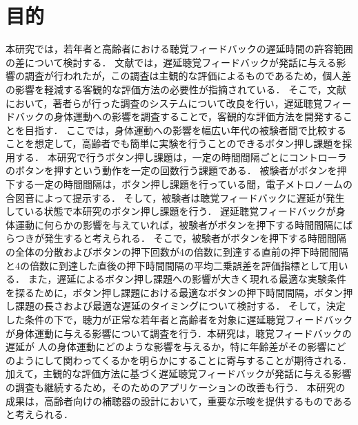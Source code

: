 \section{目的}
本研究では，若年者と高齢者における聴覚フィードバックの遅延時間の許容範囲の差について検討する．
文献\cite{kayama}では，遅延聴覚フィードバックが発話に与える影響の調査が行われたが，この調査は主観的な評価によるものであるため，個人差の影響を軽減する客観的な評価方法の必要性が指摘されている．
そこで，文献\cite{shigematu}において，著者らが行った調査のシステムについて改良を行い，遅延聴覚フィードバックの身体運動への影響を調査することで，客観的な評価方法を開発することを目指す．
ここでは，身体運動への影響を幅広い年代の被験者間で比較することを想定して，高齢者でも簡単に実験を行うことのできるボタン押し課題を採用する．
本研究で行うボタン押し課題は，一定の時間間隔ごとにコントローラのボタンを押すという動作を一定の回数行う課題である．
被験者がボタンを押下する一定の時間間隔は，ボタン押し課題を行っている間，電子メトロノームの合図音によって提示する．
そして，被験者は聴覚フィードバックに遅延が発生している状態で本研究のボタン押し課題を行う．
遅延聴覚フィードバックが身体運動に何らかの影響を与えていれば，被験者がボタンを押下する時間間隔にばらつきが発生すると考えられる．
そこで，被験者がボタンを押下する時間間隔の全体の分散およびボタンの押下回数が4の倍数に到達する直前の押下時間間隔と4の倍数に到達した直後の押下時間間隔の平均二乗誤差を評価指標として用いる．
また，遅延によるボタン押し課題への影響が大きく現れる最適な実験条件を探るために，ボタン押し課題における最適なボタンの押下時間間隔，ボタン押し課題の長さおよび最適な遅延のタイミングについて検討する．
そして，決定した条件の下で，聴力が正常な若年者と高齢者を対象に遅延聴覚フィードバックが身体運動に与える影響について調査を行う．本研究は，聴覚フィードバックの遅延が
人の身体運動にどのような影響を与えるか，特に年齢差がその影響にどのようにして関わってくるかを明らかにすることに寄与することが期待される．
加えて，主観的な評価方法に基づく遅延聴覚フィードバックが発話に与える影響の調査も継続するため，そのためのアプリケーションの改善も行う．
本研究の成果は，高齢者向けの補聴器の設計において，重要な示唆を提供するものであると考えられる．
\newpage